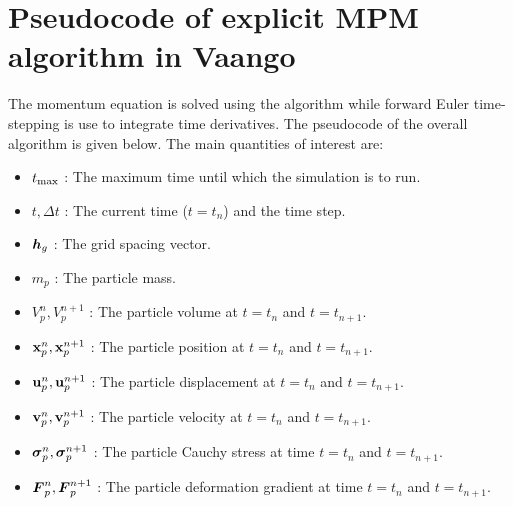 \section{Pseudocode of explicit MPM algorithm in Vaango}
The momentum equation is solved using the \MPM algorithm while forward Euler time-stepping
is use to integrate time derivatives.  The pseudocode of the overall algorithm is given below.
The main quantities of interest are:
\begin{itemize} 
  \setlength\itemsep{1pt}
  \item $t_{\text{max}}$ : {\Ochre The maximum time until which the simulation is to run.}
  \item $t, \Delta t$ : {\Ochre The current time ($t = t_n$) and the time step.}
  \item $\boldsymbol{h}_g$ : {\Ochre The grid spacing vector.}
  \item $m_p$ : {\Ochre The particle mass.}
  \item $V_p^n, V_p^{n+1}$ : {\Ochre The particle volume at $t = t_n$ and $t = t_{n+1}$.}
  \item $\mathbf{x}_p^n, \mathbf{x}_p^{n+1}$ : {\Ochre The particle position at $t = t_n$ and $t = t_{n+1}$.}
  \item $\mathbf{u}_p^n, \mathbf{u}_p^{n+1}$ : {\Ochre The particle displacement at $t = t_n$ and $t = t_{n+1}$.}
  \item $\mathbf{v}_p^n, \mathbf{v}_p^{n+1}$ : {\Ochre The particle velocity at $t = t_n$ and $t = t_{n+1}$.}
  \item $\boldsymbol{\sigma}_p^n, \boldsymbol{\sigma}_p^{n+1}$ : {\Ochre The particle Cauchy stress at time $t = t_n$ and $t = t_{n+1}$.}
  \item $\boldsymbol{F}_p^n, \boldsymbol{F}_p^{n+1}$ : {\Ochre The particle deformation gradient at time $t = t_n$ and $t = t_{n+1}$.}
\end{itemize}

